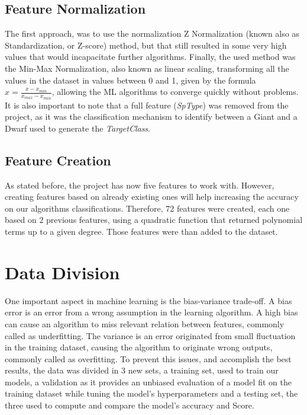 \documentclass[conference]{IEEEtran}
\begin{document}
\subsection{Feature Normalization}
The first approach, was to use the normalization Z Normalization (known also as Standardization, or Z-score) method, but that still resulted in some very high values that would incapacitate further algorithms. Finally, the used method was the Min-Max Normalization, also known as linear scaling, transforming all the values in the dataset in values between 0 and 1, given by the formula \( x = \frac{x - x_{min}}{x_{max} - x_{min}} \), allowing the ML algorithms to converge quickly without problems. It is also important to note that a full feature (\textit{SpType}) was removed from the project, as it was the classification mechanism to identify between a Giant and a Dwarf used to generate the \textit{TargetClass}.
\subsection{Feature Creation}
As stated before, the project has now five features to work with. However, creating features based on already existing ones will help increasing the accuracy on our algorithms classifications. Therefore, 72 features were created, each one based on 2 previous features, using a quadratic function that returned polynomial terms up to a given degree. Those features were than added to the dataset.



\section{Data Division}
One important aspect in machine learning is the bias-variance trade-off. A bias error is an error from a wrong assumption in the learning algorithm. A high bias can cause an algorithm to miss relevant relation between features, commonly called as underfitting. The variance is an error originated from small fluctuation in the training dataset, causing the algorithm to originate wrong outputs, commonly called as overfitting. To prevent this issues, and accomplish the best results, the data was divided in 3 new sets, a training set, used to train our models, a validation as it provides an unbiased evaluation of a model fit on the training dataset while tuning the model's hyperparameters and a testing set, the three used to compute and compare the model's accuracy and Score. 
\end{document}
